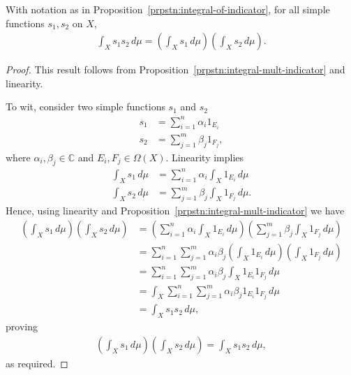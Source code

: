 \begin{proposition}
    \label{prpstn:integral-mult-simple}
    \leanok
    With notation as in Proposition~\ref{prpstn:integral-of-indicator}, for all simple functions $s_1, s_2$ on $X$,
    \begin{align}
        \int_X s_1 s_2 \, d\mu = \left( \int_X s_1 \, d\mu \right) \left( \int_X s_2 \, d\mu \right).
    \end{align}
\end{proposition}
\begin{proof}
    \leanok
This result follows from Proposition~\ref{prpstn:integral-mult-indicator} and linearity.

To wit, consider two simple functions $s_1$ and $s_2$
\begin{align}
    s_1 &= \sum_{i = 1}^n \alpha_i 1_{E_i} \\
    s_2 &= \sum_{j = 1}^m \beta_j 1_{F_j},
\end{align}
where $\alpha_i, \beta_j \in \mathbb{C}$ and $E_i, F_j \in \Omega(X)$. Linearity implies
\begin{align}
    \int_X s_1 \, d\mu &= \sum_{i = 1}^n \alpha_i \int_X 1_{E_i} \, d\mu \\
    \int_X s_2 \, d\mu &= \sum_{j = 1}^m \beta_j \int_X 1_{F_j} \, d\mu.
\end{align}
Hence, using linearity and Proposition~\ref{prpstn:integral-mult-indicator} we have
\begin{align}
    \left( \int_X s_1 \, d\mu \right) \left( \int_X s_2 \, d\mu \right)
    &= \left( \sum_{i = 1}^n \alpha_i \int_X 1_{E_i} \, d\mu \right) \left( \sum_{j = 1}^m \beta_j \int_X 1_{F_j} \, d\mu \right) \\
    &= \sum_{i = 1}^n \sum_{j = 1}^m \alpha_i \beta_j \left( \int_X 1_{E_i} \, d\mu \right) \left( \int_X 1_{F_j} \, d\mu \right) \\
    &= \sum_{i = 1}^n \sum_{j = 1}^m \alpha_i \beta_j \int_X 1_{E_i} 1_{F_j} \, d\mu \\
    &= \int_X \sum_{i = 1}^n \sum_{j = 1}^m \alpha_i \beta_j 1_{E_i} 1_{F_j} \, d\mu \\
    &= \int_X s_1 s_2 \, d\mu,
\end{align}
proving
\begin{align}
    \left( \int_X s_1 \, d\mu \right) \left( \int_X s_2 \, d\mu \right) = \int_X s_1 s_2 \, d\mu,
\end{align}
as required.
\end{proof}

